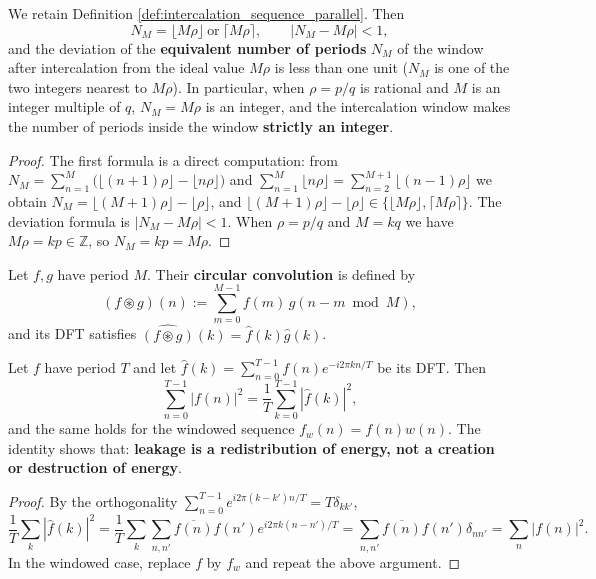 \begin{proposition}\label{prop:intercalation_window_integrality_parallel}
We retain Definition \ref{def:intercalation_sequence_parallel}. Then
\[
N_M=\lfloor M\rho\rfloor\ \text{or}\ \lceil M\rho\rceil,
\qquad
\big|N_M-M\rho\big|<1,
\]
and the deviation of the \textbf{equivalent number of periods} $N_M$ of the window after intercalation from the ideal value $M\rho$ is less than one unit ($N_M$ is one of the two integers nearest to $M\rho$). In particular, when $\rho=p/q$ is rational and $M$ is an integer multiple of $q$, $N_M=M\rho$ is an integer, and the intercalation window makes the number of periods inside the window \textbf{strictly an integer}.
\end{proposition}

\begin{proof}
The first formula is a direct computation: from $N_M=\sum_{n=1}^{M}\big(\lfloor(n+1)\rho\rfloor-\lfloor n\rho\rfloor\big)$ and $\sum_{n=1}^{M}\lfloor n\rho\rfloor=\sum_{n=2}^{M+1}\lfloor(n-1)\rho\rfloor$ we obtain $N_M=\lfloor(M+1)\rho\rfloor-\lfloor\rho\rfloor$, and $\lfloor(M+1)\rho\rfloor-\lfloor\rho\rfloor\in\{\lfloor M\rho\rfloor,\lceil M\rho\rceil\}$. The deviation formula is $|N_M-M\rho|<1$. When $\rho=p/q$ and $M=kq$ we have $M\rho=kp\in\mathbb Z$, so $N_M=kp=M\rho$.
\end{proof}

\begin{definition}\label{def:circular_convolution_parallel}
Let $f,g$ have period $M$. Their \textbf{circular convolution} is defined by
\[
(f\circledast g)(n):=\sum_{m=0}^{M-1}f(m)\,g(n-m\bmod M),
\]
and its DFT satisfies $\widehat{(f\circledast g)}(k)=\hat f(k)\hat g(k)$.
\end{definition}

\begin{theorem}\label{thm:discrete_parseval_parallel}
Let $f$ have period $T$ and let $\hat f(k)=\sum_{n=0}^{T-1}f(n)e^{-i2\pi kn/T}$ be its DFT. Then
\[
\sum_{n=0}^{T-1}|f(n)|^{2}=\frac{1}{T}\sum_{k=0}^{T-1}|\hat f(k)|^{2},
\]
and the same holds for the windowed sequence $f_w(n)=f(n)w(n)$. The identity shows that: \textbf{leakage is a redistribution of energy, not a creation or destruction of energy}.
\end{theorem}

\begin{proof}
By the orthogonality $\sum_{n=0}^{T-1}e^{i2\pi(k-k')n/T}=T\delta_{kk'}$,
\[
\frac1T\sum_k|\hat f(k)|^2=\frac1T\sum_k\sum_{n,n'}\overline{f(n)}f(n')e^{i2\pi k(n-n')/T}
=\sum_{n,n'}\overline{f(n)}f(n')\delta_{nn'}=\sum_n|f(n)|^2 .
\]
In the windowed case, replace $f$ by $f_w$ and repeat the above argument.
\end{proof}

